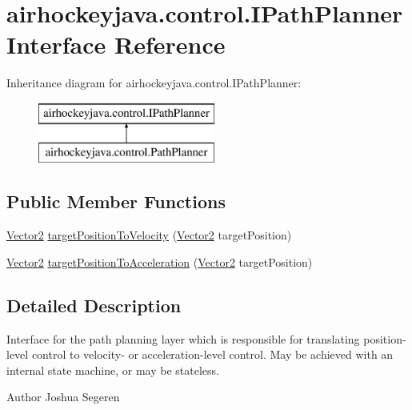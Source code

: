 \hypertarget{interfaceairhockeyjava_1_1control_1_1_i_path_planner}{}\section{airhockeyjava.\+control.\+I\+Path\+Planner Interface Reference}
\label{interfaceairhockeyjava_1_1control_1_1_i_path_planner}
Inheritance diagram for airhockeyjava.\+control.\+I\+Path\+Planner\+:\begin{figure}[H]
\begin{center}
\leavevmode
\includegraphics[height=2.000000cm]{interfaceairhockeyjava_1_1control_1_1_i_path_planner}
\end{center}
\end{figure}
\subsection*{Public Member Functions}
\begin{DoxyCompactItemize}
\item 
\hyperlink{classairhockeyjava_1_1util_1_1_vector2}{Vector2} \hyperlink{interfaceairhockeyjava_1_1control_1_1_i_path_planner_aee83440e93ac4131e13a81246544b9a2}{target\+Position\+To\+Velocity} (\hyperlink{classairhockeyjava_1_1util_1_1_vector2}{Vector2} target\+Position)
\item 
\hyperlink{classairhockeyjava_1_1util_1_1_vector2}{Vector2} \hyperlink{interfaceairhockeyjava_1_1control_1_1_i_path_planner_a02a8efedbc7650f6a0b7521860e0a5ed}{target\+Position\+To\+Acceleration} (\hyperlink{classairhockeyjava_1_1util_1_1_vector2}{Vector2} target\+Position)
\end{DoxyCompactItemize}


\subsection{Detailed Description}
Interface for the path planning layer which is responsible for translating position-\/level control to velocity-\/ or acceleration-\/level control. May be achieved with an internal state machine, or may be stateless.

\begin{DoxyAuthor}{Author}
Joshua Segeren 
\end{DoxyAuthor}


